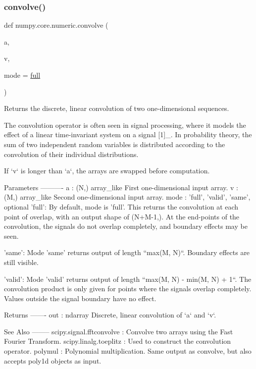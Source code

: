 \subsubsection{\texorpdfstring{convolve()}{convolve()}}
{\footnotesize\ttfamily def numpy.\+core.\+numeric.\+convolve (\begin{DoxyParamCaption}\item[{}]{a,  }\item[{}]{v,  }\item[{}]{mode = {\ttfamily \textquotesingle{}\hyperlink{namespacenumpy_1_1core_1_1numeric_aa5dcece77169e453f2094ad8a884ced8}{full}\textquotesingle{}} }\end{DoxyParamCaption})}

\begin{DoxyVerb}Returns the discrete, linear convolution of two one-dimensional sequences.

The convolution operator is often seen in signal processing, where it
models the effect of a linear time-invariant system on a signal [1]_.  In
probability theory, the sum of two independent random variables is
distributed according to the convolution of their individual
distributions.

If `v` is longer than `a`, the arrays are swapped before computation.

Parameters
----------
a : (N,) array_like
    First one-dimensional input array.
v : (M,) array_like
    Second one-dimensional input array.
mode : {'full', 'valid', 'same'}, optional
    'full':
      By default, mode is 'full'.  This returns the convolution
      at each point of overlap, with an output shape of (N+M-1,). At
      the end-points of the convolution, the signals do not overlap
      completely, and boundary effects may be seen.

    'same':
      Mode 'same' returns output of length ``max(M, N)``.  Boundary
      effects are still visible.

    'valid':
      Mode 'valid' returns output of length
      ``max(M, N) - min(M, N) + 1``.  The convolution product is only given
      for points where the signals overlap completely.  Values outside
      the signal boundary have no effect.

Returns
-------
out : ndarray
    Discrete, linear convolution of `a` and `v`.

See Also
--------
scipy.signal.fftconvolve : Convolve two arrays using the Fast Fourier
                           Transform.
scipy.linalg.toeplitz : Used to construct the convolution operator.
polymul : Polynomial multiplication. Same output as convolve, but also
          accepts poly1d objects as input.


\end{DoxyVerb}
